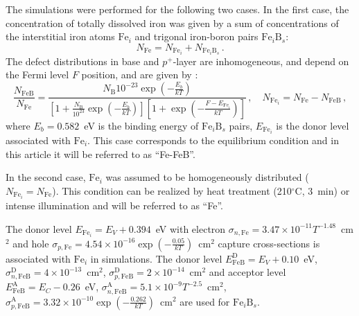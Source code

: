 \documentclass[num-refs]{wiley-article} %
\begin{document}
The simulations were performed for the following two cases.
In the first case, the concentration of totally dissolved iron was given by a sum of
concentrations of the interstitial iron atoms $\mathrm{Fe}_i$
and  trigonal iron-boron pairs $\mathrm{Fe}_i\mathrm{B}_s$:
\begin{equation}\label{eqNFeB}
  N_{\mathrm{Fe}}=N_{\mathrm{Fe}_i}+N_{\mathrm{Fe}_i\mathrm{B}_s}\,.
\end{equation}
The defect distributions in base and $p^+$-layer are inhomogeneous, and depend on the Fermi level $F$ position, and are given by
\cite{MurphyJAP2011,FeB:kinetic}:
\begin{equation}
\label{eqNFeB}
    \frac{N_{\mathrm{FeB}}}{N_{\mathrm{Fe}}}=\frac{N_\mathrm{B}10^{-23}\exp\left(-\frac{E_b}{kT}\right)}
     {\left[1+\frac{N_\mathrm{B}}{10^{23}}\exp\left(-\frac{E_b}{kT}\right)\right]\left[1+\exp\left(-\frac{F-E_{\mathrm{Fe}_i}}{kT}\right)\right]}\,,
     \quad N_{\mathrm{Fe}_i}=N_{\mathrm{Fe}}-N_{\mathrm{FeB}}\,,
\end{equation}
where
$E_b=0.582$~eV is the binding energy of $\mathrm{Fe}_i\mathrm{B}_s$ pairs,
$E_{\mathrm{Fe}_i}$ is the donor level associated with $\mathrm{Fe}_i$.
This case corresponds to the equilibrium condition and in this article it will be referred to as ``Fe-FeB''.

In the second case, $\mathrm{Fe}_i$ was assumed to be homogeneously distributed ($N_{\mathrm{Fe}_i}=N_{\mathrm{Fe}}$).
This condition can be realized by heat treatment (210$^\circ$C, 3~min) \cite{FeB_Zong}
or intense illumination \cite{FeBLight2} and will be referred to as ``Fe''.

The donor level $E_{\mathrm{Fe}_i} = E_V+0.394$~eV
with electron $\sigma_{n,{\mathrm{Fe}}}=3.47\times10^{-11}T^{-1.48}$~cm$^2$ and
hole $\sigma_{p,{\mathrm{Fe}}}=4.54\times10^{-16}\exp\left(-\frac{0.05}{kT}\right)$~cm$^2$ capture cross-sections \cite{MurphyJAP2011,ROUGIEUX2018}
is associated with $\mathrm{Fe}_i$ in simulations.
The donor level $E_{\mathrm{FeB}}^\mathrm{D}= E_V+0.10$~eV,
$\sigma_{n,{\mathrm{FeB}}}^\mathrm{D}=4\times10^{-13}$~cm$^2$,
$\sigma_{p,{\mathrm{FeB}}}^\mathrm{D}=2\times10^{-14}$~cm$^2$
and acceptor level $E_{\mathrm{FeB}}^\mathrm{A}= E_C-0.26$~eV,
$\sigma_{n,{\mathrm{FeB}}}^\mathrm{A}=5.1\times10^{-9}T^{-2.5}$~cm$^2$,
$\sigma_{p,{\mathrm{FeB}}}^\mathrm{A}=3.32\times10^{-10}\exp\left(-\frac{0.262}{kT}\right)$~cm$^2$
\cite{Istratov1999,MurphyJAP2011,ROUGIEUX2018}
are used for $\mathrm{Fe}_i\mathrm{B}_s$.
\end{document}
